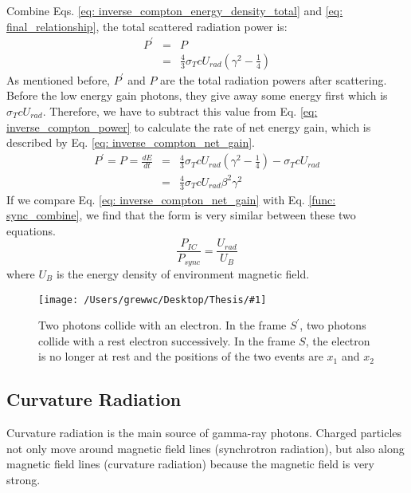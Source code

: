 \documentclass[12pt]{report}
\newcommand{\singleFig}[3]{
  \begin{figure}[!ht]
    \centering
    \texttt{[image: /Users/grewwc/Desktop/Thesis/\#1]}
    \caption{#3}
    \label{fig: #1}
  \end{figure}
}
\newcommand{\add}[1]{
  $<$\colorbox{red}{\textbf{add}}$>$#1$<$\colorbox{red}{\textbf{/add}}$>$
}
\begin{document}
            Combine Eqs. \ref{eq: inverse_compton_energy_density_total} and 
            \ref{eq: final_relationship}, the total scattered radiation power is:
            \begin{eqnarray}
              \label{eq: inverse_compton_power}
              P^{\prime} &=& P  \nonumber \\
                        &=& \frac{4}{3} \sigma_{T} c U_{rad} \left(\gamma^2 - \frac{1}{4}\right)
            \end{eqnarray}
            As mentioned before, $P^{\prime}$ and $P$ are the total radiation powers after 
            scattering. Before the 
            low energy gain photons, they give away some energy first which is $\sigma_{T} c U_{rad}$. 
            Therefore, we have to subtract this value from Eq. \ref{eq: inverse_compton_power} 
            to calculate the rate of net energy gain, which is described by Eq. 
            \ref{eq: inverse_compton_net_gain}.
            \begin{eqnarray}
              \label{eq: inverse_compton_net_gain}
              P^{\prime} = P = \frac{dE}{dt} &=& \frac{4}{3} \sigma_{T} c U_{rad} \left(\gamma^2 - \frac{1}{4}\right) - \sigma_{T} c U_{rad} \nonumber \\
                                            &=& \frac{4}{3} \sigma_{T} c U_{rad} \beta^{2} \gamma^{2}
            \end{eqnarray}
            If we compare Eq. \ref{eq: inverse_compton_net_gain} with 
            Eq. \ref{func: sync_combine}, we find that the form is very similar between these 
            two equations. 
            \begin{equation}
              \label{eq: comparision_inverse_compton_and_sync}
              \frac{P_{IC}}{P_{sync}} = \frac{U_{rad}}{U_{B}}
            \end{equation}
            where $U_{B}$ is the energy density of environment magnetic field. 

            \vspace{1cm}
            \singleFig{inverse_compton_time_interval}{0.45}{Two photons collide with an 
              electron. In the frame $S^{\prime}$, two photons collide with a rest electron 
              successively. In the frame $S$, the electron is no longer at rest and the 
              positions of the two events are $x_1$ and $x_2$}
        
        \subsection{Curvature Radiation}
          Curvature radiation is the main source of gamma-ray photons. Charged particles  
          not only move around magnetic field lines (synchrotron radiation), 
          but also along magnetic field lines (curvature radiation) because the magnetic 
          field is very strong.
\end{document}
